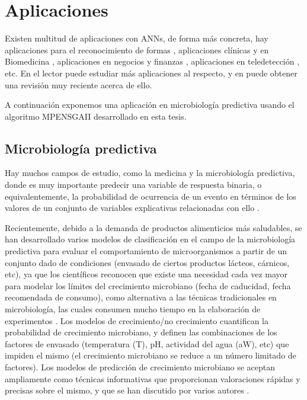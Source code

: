 \chapter{Aplicaciones}\label{aplica}
\noindent Existen multitud de aplicaciones con ANNs, de forma más concreta, hay
aplicaciones para el reconocimiento de formas \cite{Roth2006}, aplicaciones clínicas
\cite{Dybowski2001} y en Biomedicina \cite{Lisboa2000}, aplicaciones en negocios
\cite{Lisboa2000b} y finanzas \cite{Kamruzzaman2006}, aplicaciones en teledetección
\cite{Gutierrez2009e,Gutierrez2007a}, etc. En
\cite{Bishop1995,Haykin2008,Murray2010,Rabunal2006} el lector puede estudiar más aplicaciones al
respecto, y en \cite{Paliwal2009} puede obtener una revisión muy reciente acerca de ello.

A continuación exponemos una aplicación en microbiología predictiva usando el algoritmo
MPENSGAII
desarrollado en esta tesis.

\section{Microbiología predictiva}
\noindent Hay muchos campos de estudio, como la medicina y la microbiología predictiva, donde
es muy importante predecir una variable de respuesta binaria, o equivalentemente, la
probabilidad de ocurrencia de un evento en términos de los valores de un conjunto de
variables explicativas relacionadas con ello \cite{Valero2007,Valero2007b,Garcia2009}.

Recientemente, debido a la demanda de productos alimenticios más saludables, se han
desarrollado varios modelos de clasificación en el campo de la microbiología predictiva
para evaluar
el comportamiento de microorganismos a partir de un conjunto dado de condiciones
\cite{Valero2009}
(envasado de ciertos productos lácteos, cárnicos, etc), ya que los científicos
reconocen que
existe una necesidad cada vez mayor para modelar los límites del crecimiento microbiano (fecha de
caducidad, fecha recomendada de consumo), como alternativa a las técnicas tradicionales en
microbiología, las cuales consumen mucho tiempo en la elaboración de experimentos
\cite{McMeekin1996,Ross2000}. Los modelos de crecimiento/no crecimiento cuantifican la probabilidad
de crecimiento microbiano, y definen las combinaciones de los factores de envasado
(temperatura (T), pH, actividad del agua (aW), etc) que impiden el mismo (el crecimiento
microbiano se
reduce a un número limitado de factores). Los modelos de predicción de crecimiento
microbiano se aceptan ampliamente como técnicas informativas que proporcionan
valoraciones rápidas y precisas sobre el mismo, y que se han
discutido por varios autores \cite{Schaffner1997,McMeekin2000}.

